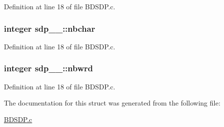 Definition at line 18 of file B\+D\+S\+D\+P.\+c.

\subsubsection[{\texorpdfstring{nbchar}{nbchar}}]{\setlength{\rightskip}{0pt plus 5cm}integer sdp\+\_\+\_\+\+::nbchar}\hypertarget{structsdp__1___abd4cced29274448d358f409bf9366a26}{}\label{structsdp__1___abd4cced29274448d358f409bf9366a26}


Definition at line 18 of file B\+D\+S\+D\+P.\+c.

\subsubsection[{\texorpdfstring{nbwrd}{nbwrd}}]{\setlength{\rightskip}{0pt plus 5cm}integer sdp\+\_\+\_\+\+::nbwrd}\hypertarget{structsdp__1___aa3327eb2ed6551a9256044f8c8b5d216}{}\label{structsdp__1___aa3327eb2ed6551a9256044f8c8b5d216}


Definition at line 18 of file B\+D\+S\+D\+P.\+c.



The documentation for this struct was generated from the following file\+:\begin{DoxyCompactItemize}
\item 
\hyperlink{BDSDP_8c}{B\+D\+S\+D\+P.\+c}\end{DoxyCompactItemize}
